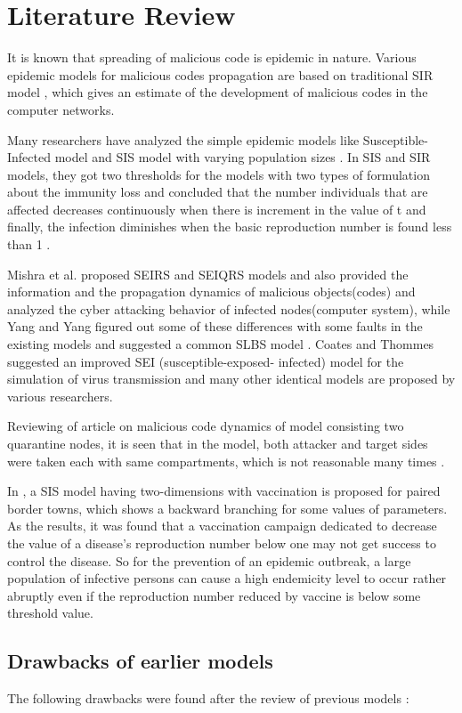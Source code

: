 \section{Literature Review}
It is known that spreading of malicious code is epidemic in nature. Various epidemic models for malicious codes propagation are based on traditional SIR model \cite{edtr4,edtr1,edtr3}, which gives an estimate of the development of malicious codes in the computer networks.
\par Many researchers have analyzed the simple epidemic models like Susceptible- Infected model and SIS model with varying population sizes \cite{edtr4,edtr5}.
 In SIS and SIR models, they got two thresholds for the models with two types of formulation about the immunity loss and concluded that the number individuals
 that are affected decreases continuously when there is increment in the value of t and finally, the infection diminishes when the basic reproduction
 number is found less than 1 \cite{edtr18}.
\par Mishra et al. proposed SEIRS and SEIQRS \cite{edtr7,edtr2} models and also provided the information and the propagation dynamics of malicious
 objects(codes) and analyzed the cyber attacking behavior of infected nodes(computer system), while Yang and Yang figured out some of these differences with
 some faults in the existing models and suggested a common SLBS model \cite{edtr16,edtr20,edtr8}. Coates and Thommes suggested an improved SEI
 (susceptible-exposed- infected) model for the simulation of virus transmission \cite{edtr6} and many other identical models are proposed by various researchers.
\par Reviewing of article on malicious code dynamics of model consisting two quarantine nodes, it is seen that in the model, both attacker and target sides
 were taken each with same compartments, which is not reasonable many times \cite{edtr9}.
 \par In \cite{edtr21}, a SIS model having two-dimensions with vaccination is proposed for paired border towns, which shows a backward
 branching for some values of parameters. As the results, it was found that a vaccination campaign dedicated to decrease the value of a disease's reproduction
 number below one may not get success to control the disease. So for the prevention of an epidemic outbreak, a large population of infective persons
 can cause a high endemicity level to occur rather abruptly even if the reproduction number reduced by vaccine is below some threshold value.
 \clearpage
\subsection{Drawbacks of earlier models}
The following drawbacks were found after the review of previous models :
